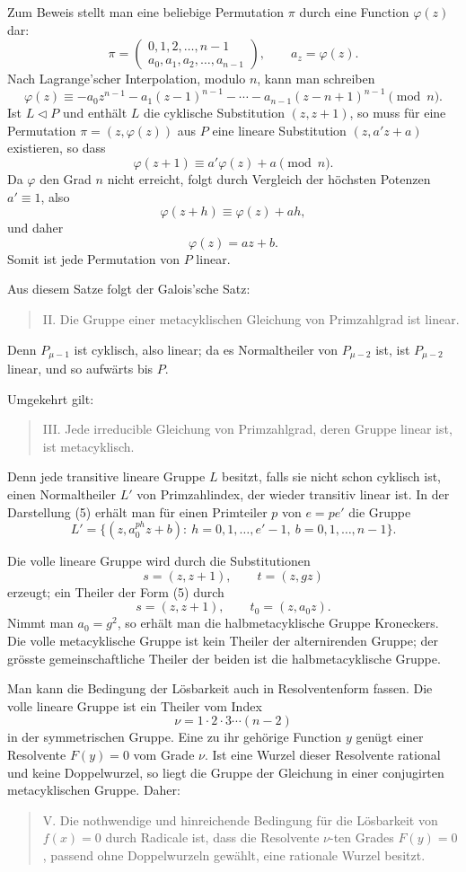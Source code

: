 \documentclass[11pt]{article}
\providecommand{\perm}[2]{\begin{pmatrix}#1\\#2\end{pmatrix}}
\begin{document}
Zum Beweis stellt man eine beliebige Permutation $\pi$ durch eine Function $\varphi(z)$ dar:
\[
 \pi=\perm{0,1,2,\ldots,n-1}{a_0,a_1,a_2,\ldots,a_{n-1}},
 \qquad a_z=\varphi(z).
\]
Nach Lagrange'scher Interpolation, modulo $n$, kann man schreiben
\[
  \varphi(z)\equiv -a_0 z^{n-1}-a_1(z-1)^{n-1}-\cdots-a_{n-1}(z-n+1)^{n-1}\pmod n. \tag{6}
\]
Ist $L\triangleleft P$ und enthält $L$ die cyklische Substitution $(z,z+1)$, so muss für eine Permutation $\pi=(z,\varphi(z))$ aus $P$ eine lineare Substitution $(z,a'z+a)$ existieren, so dass
\[
  \varphi(z+1)\equiv a'\varphi(z)+a\pmod n.                     \tag{7}
\]
Da $\varphi$ den Grad $n$ nicht erreicht, folgt durch Vergleich der höchsten Potenzen $a'\equiv1$, also
\[
  \varphi(z+h)\equiv \varphi(z)+ah,
\]
und daher
\[
  \varphi(z)=az+b.                                               \tag{8}
\]
Somit ist jede Permutation von $P$ linear.

Aus diesem Satze folgt der Galois'sche Satz:
\begin{quote}
II. Die Gruppe einer metacyklischen Gleichung von Primzahlgrad ist linear.
\end{quote}
Denn $P_{\mu-1}$ ist cyklisch, also linear; da es Normaltheiler von $P_{\mu-2}$ ist, ist $P_{\mu-2}$ linear, und so aufwärts bis $P$.

Umgekehrt gilt:
\begin{quote}
III. Jede irreducible Gleichung von Primzahlgrad, deren Gruppe linear ist, ist metacyklisch.
\end{quote}
Denn jede transitive lineare Gruppe $L$ besitzt, falls sie nicht schon cyklisch ist, einen Normaltheiler $L'$ von Primzahlindex, der wieder transitiv linear ist. In der Darstellung (5) erhält man für einen Primteiler $p$ von $e=pe'$ die Gruppe
\[
  L'=\bigl\{(z,a_0^{ph}z+b):\ h=0,1,\ldots,e'-1,
       \ b=0,1,\ldots,n-1\bigr\}.
\]

Die volle lineare Gruppe wird durch die Substitutionen
\[
  s=(z,z+1),\qquad t=(z,gz)                                      \tag{9}
\]
erzeugt; ein Theiler der Form (5) durch
\[
  s=(z,z+1),\qquad t_0=(z,a_0z).                                \tag{10}
\]
Nimmt man $a_0=g^2$, so erhält man die halbmetacyklische Gruppe Kroneckers. Die volle metacyklische Gruppe ist kein Theiler der alternirenden Gruppe; der grösste gemeinschaftliche Theiler der beiden ist die halbmetacyklische Gruppe.

Man kann die Bedingung der Lösbarkeit auch in Resolventenform fassen. Die volle lineare Gruppe ist ein Theiler vom Index
\[
  \nu=1\cdot2\cdot3\cdots(n-2)
\]
in der symmetrischen Gruppe. Eine zu ihr gehörige Function $y$ genügt einer Resolvente $F(y)=0$ vom Grade $\nu$. Ist eine Wurzel dieser Resolvente rational und keine Doppelwurzel, so liegt die Gruppe der Gleichung in einer conjugirten metacyklischen Gruppe. Daher:
\begin{quote}
V. Die nothwendige und hinreichende Bedingung für die Lösbarkeit von $f(x)=0$ durch Radicale ist, dass die Resolvente $\nu$-ten Grades $F(y)=0$, passend ohne Doppelwurzeln gewählt, eine rationale Wurzel besitzt.
\end{quote}
\end{document}
